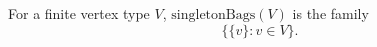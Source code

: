 For a finite vertex type \(V\), \(\mathrm{singletonBags}(V)\) is the family
\[
  \{\{v\}: v\in V\}.
\]
